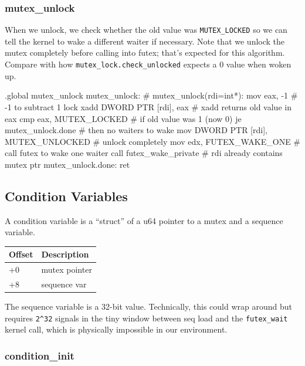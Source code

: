 \subsubsection{mutex\_unlock}

When we unlock, we check whether the old value was \lstinline|MUTEX_LOCKED| so
we can tell the kernel to wake a different waiter if necessary. Note that we
unlock the mutex completely before calling into futex; that's expected for this
algorithm. Compare with how \lstinline|mutex_lock.check_unlocked| expects a 0
value when woken up.

\begin{asm}
.global mutex_unlock
mutex_unlock:				    # mutex_unlock(rdi=int*):
	mov	eax, -1			    #   -1 to subtract 1
	lock	xadd DWORD PTR [rdi], eax   #   xadd returns old value in eax
	cmp	eax, MUTEX_LOCKED	    #   if old value was 1 (now 0)
	je	mutex_unlock.done	    #   then no waiters to wake
	mov DWORD PTR [rdi], MUTEX_UNLOCKED #   unlock completely
	mov	edx, FUTEX_WAKE_ONE	    #   call futex to wake one waiter
	call	futex_wake_private	    #   rdi already contains mutex ptr
mutex_unlock.done:
	ret
\end{asm}

\subsection{Condition Variables}

A condition variable is a ``struct'' of a u64 pointer to a mutex and a sequence
variable.

\begin{table}[h]
\begin{tabular}{|l|l|}\hline
Offset & Description   \\\hline
+0     & mutex pointer \\
+8     & sequence var  \\\hline
\end{tabular}
\end{table}

The sequence variable is a 32-bit value. Technically, this could wrap around
but requires \lstinline|2^32| signals in the tiny window between seq load and
the \lstinline|futex_wait| kernel call, which is physically impossible in our
environment.

\subsubsection{condition\_init}

